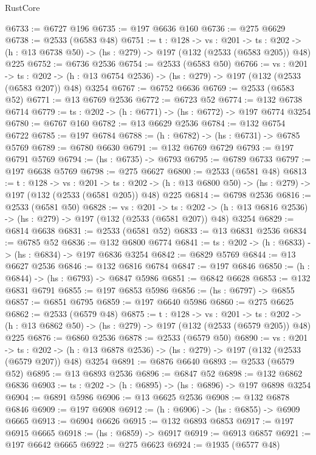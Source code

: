\begin{lexlean}{RustCore}
\begin{coremodule}
@6733 := @6727 @196
@6735 := @197 @6636 @160
@6736 := @275 @6629
@6738 := @2533 (@6583 @48)
@6751 := {t : @128} ->
  {vs : @201} ->
  {ts : @202} -> (h : @13 @6738 @50) -> (hs : @279) -> @197 (@132 (@2533 (@6583 @205)) @48) @225
@6752 := @6736 @2536
@6754 := @2533 (@6583 @50)
@6766 := {vs : @201} ->
  {ts : @202} -> (h : @13 @6754 @2536) -> (hs : @279) -> @197 (@132 (@2533 (@6583 @207)) @48) @3254
@6767 := @6752 @6636
@6769 := @2533 (@6583 @52)
@6771 := @13 @6769 @2536
@6772 := @6723 @52
@6774 := @132 @6738 @6714
@6779 := {ts : @202} -> (h : @6771) -> (hs : @6772) -> @197 @6774 @3254
@6780 := @6767 @160
@6782 := @13 @6629 @2536
@6784 := @132 @6754 @6722
@6785 := @197 @6784
@6788 := (h : @6782) -> (hs : @6731) -> @6785 @5769
@6789 := @6780 @6630
@6791 := @132 @6769 @6729
@6793 := @197 @6791 @5769
@6794 := (hs : @6735) -> @6793
@6795 := @6789 @6733
@6797 := @197 @6638 @5769
@6798 := @275 @6627
@6800 := @2533 (@6581 @48)
@6813 := {t : @128} ->
  {vs : @201} ->
  {ts : @202} -> (h : @13 @6800 @50) -> (hs : @279) -> @197 (@132 (@2533 (@6581 @205)) @48) @225
@6814 := @6798 @2536
@6816 := @2533 (@6581 @50)
@6828 := {vs : @201} ->
  {ts : @202} -> (h : @13 @6816 @2536) -> (hs : @279) -> @197 (@132 (@2533 (@6581 @207)) @48) @3254
@6829 := @6814 @6638
@6831 := @2533 (@6581 @52)
@6833 := @13 @6831 @2536
@6834 := @6785 @52
@6836 := @132 @6800 @6774
@6841 := {ts : @202} -> (h : @6833) -> (hs : @6834) -> @197 @6836 @3254
@6842 := @6829 @5769
@6844 := @13 @6627 @2536
@6846 := @132 @6816 @6784
@6847 := @197 @6846
@6850 := (h : @6844) -> (hs : @6793) -> @6847 @5986
@6851 := @6842 @6628
@6853 := @132 @6831 @6791
@6855 := @197 @6853 @5986
@6856 := (hs : @6797) -> @6855
@6857 := @6851 @6795
@6859 := @197 @6640 @5986
@6860 := @275 @6625
@6862 := @2533 (@6579 @48)
@6875 := {t : @128} ->
  {vs : @201} ->
  {ts : @202} -> (h : @13 @6862 @50) -> (hs : @279) -> @197 (@132 (@2533 (@6579 @205)) @48) @225
@6876 := @6860 @2536
@6878 := @2533 (@6579 @50)
@6890 := {vs : @201} ->
  {ts : @202} -> (h : @13 @6878 @2536) -> (hs : @279) -> @197 (@132 (@2533 (@6579 @207)) @48) @3254
@6891 := @6876 @6640
@6893 := @2533 (@6579 @52)
@6895 := @13 @6893 @2536
@6896 := @6847 @52
@6898 := @132 @6862 @6836
@6903 := {ts : @202} -> (h : @6895) -> (hs : @6896) -> @197 @6898 @3254
@6904 := @6891 @5986
@6906 := @13 @6625 @2536
@6908 := @132 @6878 @6846
@6909 := @197 @6908
@6912 := (h : @6906) -> (hs : @6855) -> @6909 @6665
@6913 := @6904 @6626
@6915 := @132 @6893 @6853
@6917 := @197 @6915 @6665
@6918 := (hs : @6859) -> @6917
@6919 := @6913 @6857
@6921 := @197 @6642 @6665
@6922 := @275 @6623
@6924 := @1935 (@6577 @48)

\end{coremodule}
\end{lexlean}
